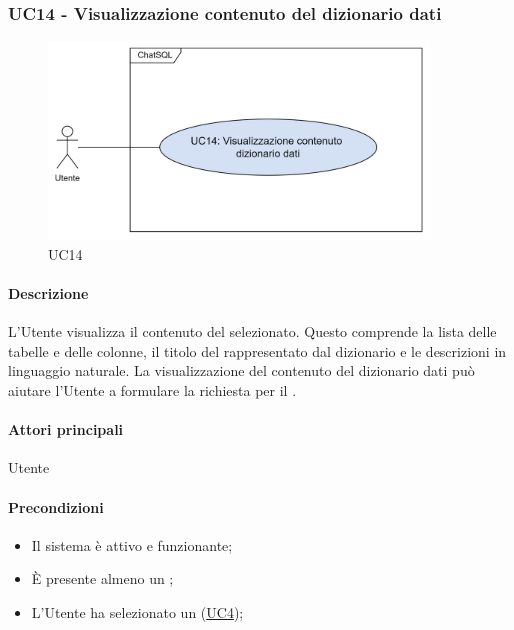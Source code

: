 \subsubsection{UC14 - Visualizzazione contenuto del dizionario dati}\label{UC14}

\begin{figure}[H]
  \centering
  \includegraphics[width=0.90\textwidth]{assets/uc14.png}
  \caption{UC14}
\end{figure}

\paragraph*{Descrizione}
L'Utente visualizza il contenuto del  selezionato. Questo comprende la lista delle tabelle e delle colonne, il titolo del  rappresentato dal dizionario e le descrizioni in linguaggio naturale. La visualizzazione del contenuto del dizionario dati può aiutare l'Utente a formulare la richiesta per il .

\paragraph*{Attori principali}
Utente

\paragraph*{Precondizioni}
\begin{itemize}
  \item Il sistema è attivo e funzionante;
  \item È presente almeno un ;
  \item L'Utente ha selezionato un  (\hyperref[UC4]{UC4});
\end{itemize}

